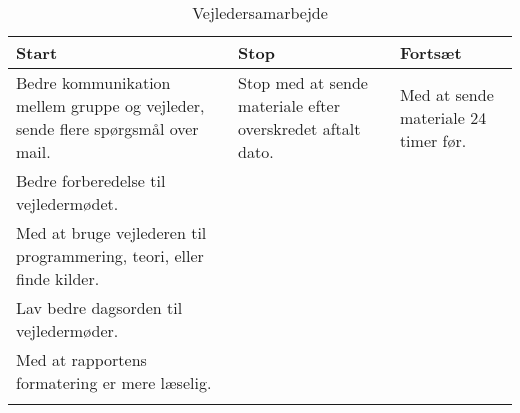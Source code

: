 \setlength{\LTleft}{-20cm plus -1fill}
\setlength{\LTright}{\LTleft}
\begin{longtable}{| p{} | p{} | p{} |}
\hline
\textbf{Start}                                                                  & \textbf{Stop}                                              & \textbf{Fortsæt}                     \\ \hline
Bedre kommunikation mellem gruppe og vejleder, sende flere spørgsmål over mail. & Stop med at sende materiale efter overskredet aftalt dato. & Med at sende materiale 24 timer før. \\ \hline
Bedre forberedelse til vejledermødet.                                           &                                                            &                                      \\ \hline
Med at bruge vejlederen til programmering, teori, eller finde kilder.           &                                                            &                                      \\ \hline
Lav bedre dagsorden til vejledermøder.                                          &                                                            &                                      \\ \hline
Med at rapportens formatering er mere læselig.                                  &                                                            &                                      \\ \hline
\caption{Vejledersamarbejde}\label{VejledersamarbejdeSSF}
\end{longtable}